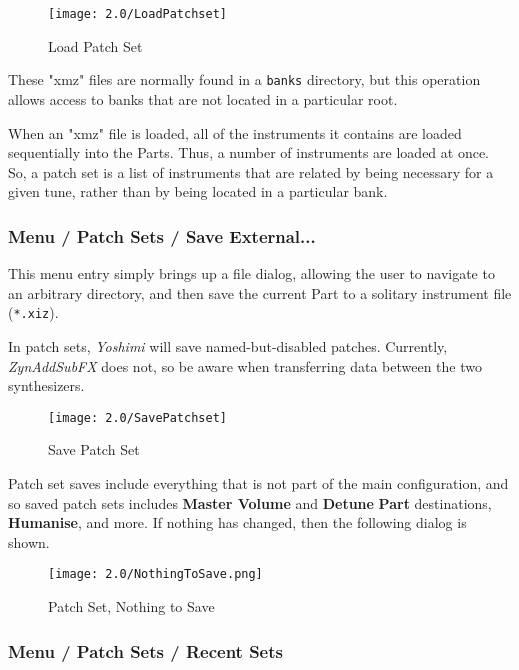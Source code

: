 \begin{figure}[H]
   \centering
   \texttt{[image: 2.0/LoadPatchset]}
   \caption{Load Patch Set}
   \label{fig:yoshimi_menu_open_parameters}
\end{figure}

   These "xmz" files are normally found in a \texttt{banks} directory, but this
   operation allows access to banks that are not located in a particular root.

   When an "xmz" file is loaded, all of the instruments it contains are
   loaded sequentially into the Parts.  Thus, a number of instruments are loaded
   at once.  So, a patch set is a list of instruments that are related by
   being necessary for a given tune, rather than by being located in a
   particular bank.

\subsubsection{Menu / Patch Sets / Save External...}
\label{subsubsec:menu_patch_sets_save}

   This menu entry simply brings up a file dialog, allowing the user to
   navigate to an arbitrary directory, and then save the current Part
   to a solitary instrument file (\texttt{*.xiz}).

   In patch sets, \textsl{Yoshimi} will save named-but-disabled patches.
   Currently, \textsl{ZynAddSubFX} does not, so be aware when transferring
   data between the two synthesizers.

\begin{figure}[H]
   \centering
   \texttt{[image: 2.0/SavePatchset]}
   \caption{Save Patch Set}
   \label{fig:yoshimi_menu_save_parameters}
\end{figure}

   Patch set saves include everything that is not part of the main
   configuration, and so saved patch sets
   includes \textbf{Master Volume} and \textbf{Detune}
   \textbf{Part} destinations, \textbf{Humanise},
   and more.
   If nothing has changed, then the following dialog is shown.

\begin{figure}[H]
   \centering
   \texttt{[image: 2.0/NothingToSave.png]}
   \caption{Patch Set, Nothing to Save}
   \label{fig:yoshimi_menu_nothing_to_save_parameters}
\end{figure}

\subsubsection{Menu / Patch Sets / Recent Sets}
\label{subsubsec:menu_patch_sets_recent_sets}


